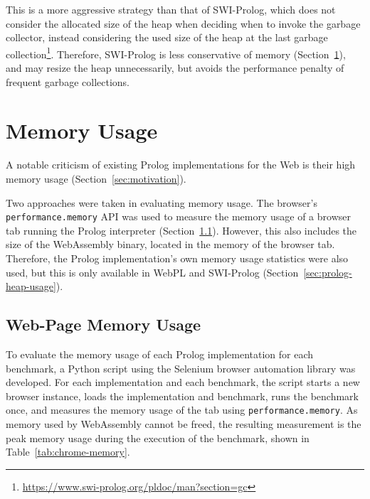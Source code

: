 This is a more aggressive strategy than that of SWI-Prolog, which does not consider the allocated size of the heap when deciding when to invoke the garbage collector, instead considering the used size of the heap at the last garbage collection\footnote{\url{https://www.swi-prolog.org/pldoc/man?section=gc}}. Therefore, SWI-Prolog is less conservative of memory (Section~\ref{sec:memory-usage}), and may resize the heap unnecessarily, but avoids the performance penalty of frequent garbage collections.

\section{Memory Usage}

\label{sec:memory-usage}

A notable criticism of existing Prolog implementations for the Web is their high memory usage (Section~\ref{sec:motivation}).

Two approaches were taken in evaluating memory usage. The browser's \texttt{performance.memory} API was used to measure the memory usage of a browser tab running the Prolog interpreter (Section~\ref{sec:web-page-memory-usage}). However, this also includes the size of the WebAssembly binary, located in the memory of the browser tab. Therefore, the Prolog implementation's own memory usage statistics were also used, but this is only available in WebPL and SWI-Prolog (Section~\ref{sec:prolog-heap-usage}).

\subsection{Web-Page Memory Usage}

\label{sec:web-page-memory-usage}

To evaluate the memory usage of each Prolog implementation for each benchmark, a Python script using the Selenium browser automation library \cite{softwarefreedomconservancySeleniumhttpsgithubcom2025} was developed. For each implementation and each benchmark, the script starts a new browser instance, loads the implementation and benchmark, runs the benchmark once, and measures the memory usage of the tab using \texttt{performance.memory}. As memory used by WebAssembly cannot be freed, the resulting measurement is the peak memory usage during the execution of the benchmark, shown in Table~\ref{tab:chrome-memory}.

